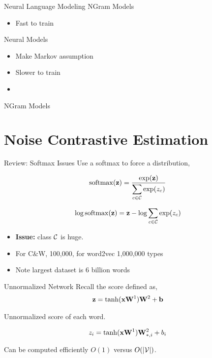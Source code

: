\documentclass{beamer}
\begin{document}
\begin{frame}{Neural Language Modeling}
  NGram Models
  \begin{itemize}
  \item Fast to train 
  \end{itemize}

  Neural Models
  \begin{itemize}
  \item Make Markov assumption
  \item Slower to train
  \item
  \end{itemize}
\end{frame}

\begin{frame}{NGram Models}
  
\end{frame}

\section{Noise Contrastive Estimation}

\begin{frame}{Review: Softmax Issues}
  Use a softmax to force a distribution,

  \[\softmax(\boldz) = \frac{\exp(\boldz)}{\displaystyle \sum_{c\in \mcC } \exp(z_c)}  \]

  \[\log \softmax(\boldz) = \boldz - \log \sum_{c\in \mcC} \exp(z_c)  \]

  \begin{itemize}
  \item \textbf{Issue:} class $\mathcal{C}$ is huge.
  \item For C\&W, 100,000, for word2vec 1,000,000 types
  \item Note largest dataset is 6 billion words
  \end{itemize}

\end{frame}



\begin{frame}{Unnormalized Network}
  Recall the score defined as, 
  \[ \mathbf{z} = \tanh(\mathbf{x} \mathbf{W}^1)\mathbf{W}^2 + \mathbf{b} \] 

  Unnormalized score of each word. 

  \[ z_i = \tanh(\mathbf{x} \mathbf{W}^1)\mathbf{W}^2_{*,i} + b_i \] 

  Can be computed efficiently $O(1)$ versus $O(|\mathcal{V}|)$. 
\end{frame}
\end{document}

